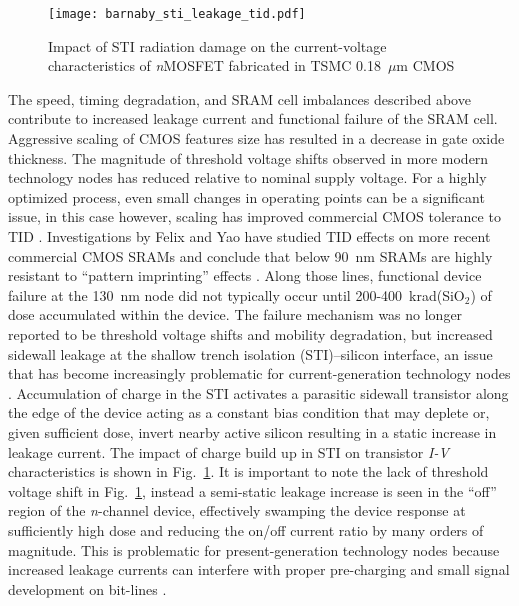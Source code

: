 \begin{figure}[tb]
    \begin{center}
        \texttt{[image: barnaby\_sti\_leakage\_tid.pdf]}
    \end{center}
    \caption[Impact of STI radiation damage on the current-voltage characteristics of \emph{n}MOSFET fabricated in TSMC 0.18~$\mu$m CMOS.]{Impact of STI radiation damage on the current-voltage characteristics of \emph{n}MOSFET fabricated in TSMC 0.18~$\mu$m CMOS \cite{Barnaby:2006cp}}
    \label{fig:tid_sti_leak}
\end{figure}

The speed, timing degradation, and SRAM cell imbalances described above contribute to increased leakage current and functional failure of the SRAM cell.
Aggressive scaling of CMOS features size has resulted in a decrease in gate oxide thickness.
The magnitude of threshold voltage shifts observed in more modern technology nodes has reduced relative to nominal supply voltage. 
For a highly optimized process, even small changes in operating points can be a significant issue, in this case however, scaling has improved commercial CMOS tolerance to TID \cite{Barnaby:2006cp,Felix:2006jl}. 
Investigations by Felix and Yao have studied TID effects on more recent commercial CMOS SRAMs and conclude that below 90~nm SRAMs are highly resistant to ``pattern imprinting'' effects \cite{Felix:2006jl,Yao:2008ce,Nair:2013to}.
Along those lines, functional device failure at the 130~nm node did not typically occur until 200-400~krad(SiO$_2$) of dose accumulated within the device.
The failure mechanism was no longer reported to be threshold voltage shifts and mobility degradation, but increased sidewall leakage at the shallow trench isolation (STI)--silicon interface, an issue that has become increasingly problematic for current-generation technology nodes \cite{Felix:2006jl,Barnaby:2006cp}. 
Accumulation of charge in the STI activates a parasitic sidewall transistor along the edge of the device acting as a constant bias condition that may deplete or, given sufficient dose, invert nearby active silicon resulting in a static increase in leakage current.
The impact of charge build up in STI on transistor \emph{I-V} characteristics is shown in Fig.~\ref{fig:tid_sti_leak}.
It is important to note the lack of threshold voltage shift in Fig.~\ref{fig:tid_sti_leak}, instead a semi-static leakage increase is seen in the ``off'' region of the \emph{n}-channel device, effectively swamping the device response at sufficiently high dose and reducing the on/off current ratio by many orders of magnitude.
This is problematic for present-generation technology nodes because increased leakage currents can interfere with proper pre-charging and small signal development on bit-lines \cite{Yao:2008ce}.

